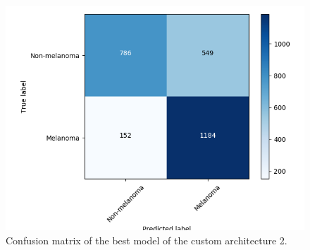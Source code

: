 \begin{figure}[ht]
    \centering
    \includegraphics[width=1.0\textwidth]{figs/custom2_best_confusionmatrix.png}
    \caption{Confusion matrix of the best model of the custom architecture 2.}
    \label{fig:custom2_best_confusionmatrix}
\end{figure}
